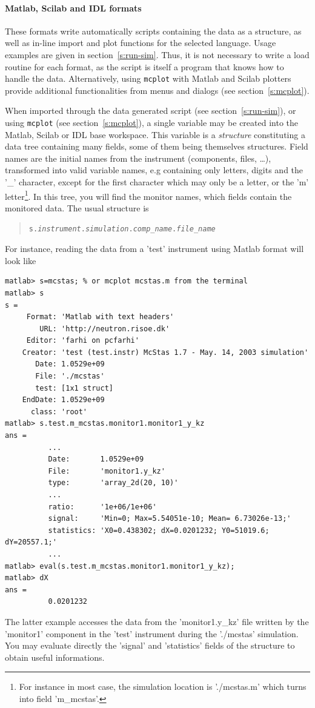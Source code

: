 \paragraph{Matlab, Scilab and IDL formats}
   

These formats write automatically scripts containing the data as a structure, as well as in-line import and plot functions for the selected language. Usage examples are given in section~\ref{s:run-sim}. 
Thus, it is not necessary to write a load routine for each format, as the script is itself a program that knows how to handle the data. Alternatively, using \verb+mcplot+ with Matlab and Scilab plotters provide additional functionalities from menus and dialogs (see section~\ref{s:mcplot}).

When imported through the data generated script (see section~\ref{s:run-sim}), or using \verb+mcplot+ (see section~\ref{s:mcplot}), a single variable may be created into the Matlab, Scilab or IDL base workspace. This variable is a \emph{structure} constituting a data tree containing many fields, some of them being themselves structures. Field names are the initial names from the instrument (components, files, \ldots), transformed into valid variable names, e.g containing only letters, digits and the '\_' character, except for the first character which may only be a letter, or the 'm' letter\footnote{For instance in most case, the simulation location is './mcstas.m' which turns into field 'm\_mcstas'.}. 
In this tree, you will find the monitor names, which fields contain the monitored data. The usual structure is
\begin{quote}
  \texttt{s.{\it instrument}.{\it simulation}.{\it comp\_name}.{\it file\_name}}
\end{quote}

For instance, reading the data from a 'test' instrument using Matlab format will look like
\begin{verbatim}
matlab> s=mcstas; % or mcplot mcstas.m from the terminal
matlab> s
s =
     Format: 'Matlab with text headers'
        URL: 'http://neutron.risoe.dk'
     Editor: 'farhi on pcfarhi'
    Creator: 'test (test.instr) McStas 1.7 - May. 14, 2003 simulation'
       Date: 1.0529e+09
       File: './mcstas'
       test: [1x1 struct]
    EndDate: 1.0529e+09
      class: 'root'
matlab> s.test.m_mcstas.monitor1.monitor1_y_kz
ans =
          ...
          Date:       1.0529e+09
          File:       'monitor1.y_kz'
          type:       'array_2d(20, 10)'
          ...
          ratio:      '1e+06/1e+06'
          signal:     'Min=0; Max=5.54051e-10; Mean= 6.73026e-13;'
          statistics: 'X0=0.438302; dX=0.0201232; Y0=51019.6; dY=20557.1;'
          ...
matlab> eval(s.test.m_mcstas.monitor1.monitor1_y_kz);
matlab> dX
ans =
          0.0201232
\end{verbatim}      
The latter example accesses the data from the 'monitor1.y\_kz' file written by the 'monitor1' component in the 'test' instrument during the './mcstas' simulation. You may evaluate directly the 'signal' and 'statistics' fields of the structure to obtain useful informations.


